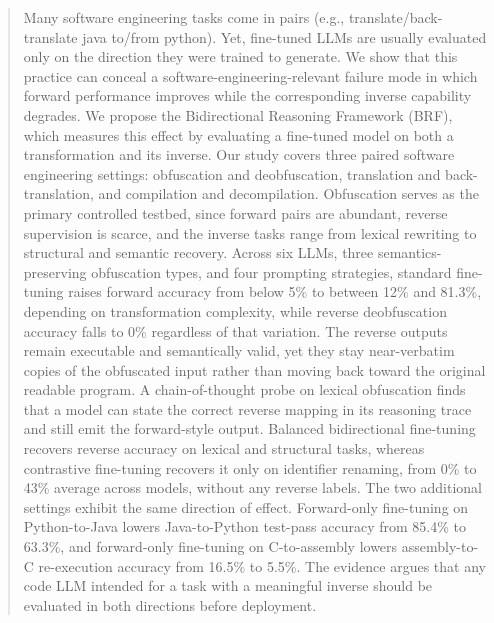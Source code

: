 \documentclass[acmtosem, screen ,review]{acmart}
\newcommand{\wcircle}[1]{\ding{\numexpr171 + #1}}
\begin{document}
\begin{abstract}

Many software engineering tasks come in pairs (e.g., translate/back-translate java to/from python). Yet, fine-tuned LLMs are usually evaluated only on the direction they were
trained to generate. We show that this practice can conceal a
software-engineering-relevant failure mode in which forward performance improves
while the corresponding inverse capability degrades. We propose
the Bidirectional Reasoning Framework (BRF), which measures this effect by evaluating a fine-tuned model
on both a transformation and its inverse. Our study covers three paired software
engineering settings: \wcircle{1} obfuscation and deobfuscation, \wcircle{2} translation and back-translation, and \wcircle{3} compilation and decompilation. Obfuscation serves as the
primary controlled testbed, since forward pairs are abundant, reverse
supervision is scarce, and the inverse tasks range from lexical rewriting to
structural and semantic recovery. Across six LLMs, three semantics-preserving
obfuscation types, and four prompting strategies, standard fine-tuning raises
forward accuracy from below 5\% to between 12\% and 81.3\%, depending on transformation complexity, while reverse deobfuscation accuracy falls to 0\% regardless of that variation. The reverse outputs remain executable and semantically valid,
yet they stay near-verbatim copies of the obfuscated input rather than moving
back toward the original readable program. A chain-of-thought probe on lexical
obfuscation finds that a model can state the correct reverse mapping in its
reasoning trace and still emit the forward-style output. Balanced bidirectional
fine-tuning recovers reverse accuracy on lexical and structural tasks, whereas
contrastive fine-tuning recovers it only on identifier renaming, from 0\% to
43\% average across models, without any reverse labels. The two additional settings exhibit the same
direction of effect. Forward-only fine-tuning on Python-to-Java lowers
Java-to-Python test-pass accuracy from 85.4\% to 63.3\%, and forward-only
fine-tuning on C-to-assembly lowers assembly-to-C re-execution accuracy from
16.5\% to 5.5\%. The evidence argues that any code LLM intended for a task with a
meaningful inverse should be evaluated in both directions before deployment.

\end{abstract}

\end{document}

